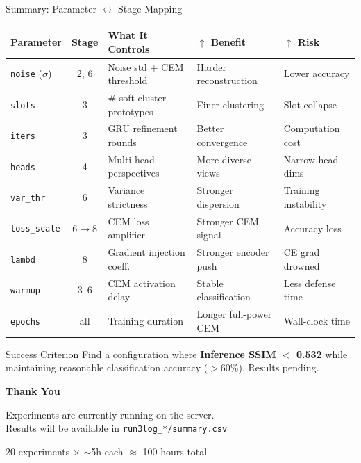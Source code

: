 \documentclass[aspectratio=169, 10pt]{beamer}
\newcommand{\param}[1]{\textcolor{paramred}{\texttt{#1}}}
\begin{document}
\begin{frame}{Summary: Parameter $\leftrightarrow$ Stage Mapping}

\begin{center}
\scriptsize
\begin{tabular}{p{1.8cm}cp{3.5cm}p{3cm}p{2.5cm}}
\toprule
\textbf{Parameter} & \textbf{Stage} & \textbf{What It Controls} & \textbf{$\uparrow$ Benefit} & \textbf{$\uparrow$ Risk} \\
\midrule
\param{noise} ($\sigma$) & 2, 6 & Noise std + CEM threshold & Harder reconstruction & Lower accuracy \\
\param{slots} & 3 & \# soft-cluster prototypes & Finer clustering & Slot collapse \\
\param{iters} & 3 & GRU refinement rounds & Better convergence & Computation cost \\
\param{heads} & 4 & Multi-head perspectives & More diverse views & Narrow head dims \\
\param{var\_thr} & 6 & Variance strictness & Stronger dispersion & Training instability \\
\param{loss\_scale} & 6$\to$8 & CEM loss amplifier & Stronger CEM signal & Accuracy loss \\
\param{lambd} & 8 & Gradient injection coeff. & Stronger encoder push & CE grad drowned \\
\param{warmup} & 3--6 & CEM activation delay & Stable classification & Less defense time \\
\param{epochs} & all & Training duration & Longer full-power CEM & Wall-clock time \\
\bottomrule
\end{tabular}
\end{center}

\vspace{0.3cm}
\begin{block}{Success Criterion}
Find a configuration where \textbf{Inference SSIM $<$ 0.532} while maintaining reasonable classification accuracy ($>$60\%). Results pending.
\end{block}

\end{frame}

\begin{frame}{}
\vfill
\begin{center}
{\Huge\textbf{Thank You}}

\vspace{1cm}
{\large Experiments are currently running on the server.\\
Results will be available in \texttt{run3log\_*/summary.csv}}

\vspace{0.8cm}
{\normalsize 20 experiments $\times$ $\sim$5h each $\approx$ 100 hours total}
\end{center}
\vfill
\end{frame}
\end{document}
